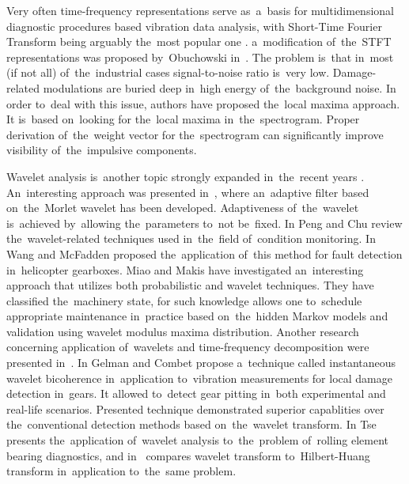 Very often time-frequency representations serve as~a~basis for multidimensional diagnostic procedures based vibration data analysis, with Short-Time Fourier Transform being arguably the~most popular one \cite{oppenheim1999discrete}. a~modification of~the~STFT representations was proposed by~Obuchowski in~\cite{obuch3}. The problem is~that in~most (if not all) of~the~industrial cases signal-to-noise ratio is~very low. Damage-related modulations are buried deep in~high energy of~the~background noise. In order to~deal with this issue, authors have proposed the~local maxima approach. It is~based on~looking for the~local maxima in~the~spectrogram. Proper derivation of~the~weight vector for the~spectrogram can significantly improve visibility of~the~impulsive components. 

Wavelet analysis is~another topic strongly expanded in~the~recent years \cite{WANG1996927, staszewski, samuel3}. An~interesting approach was presented in~\cite{linzuo}, where an~adaptive filter based on~the~Morlet wavelet has been developed. Adaptiveness of~the~wavelet is~achieved by~allowing the~parameters to~not be~fixed. In \cite{rozsz_jve_16} Peng and Chu review the~wavelet-related techniques used in~the~field of~condition monitoring. In \cite{WANG1996927} Wang and McFadden proposed the~application of~this method for fault detection in~helicopter gearboxes. Miao and Makis \cite{MIAO2007840} have investigated an~interesting approach that utilizes both probabilistic and wavelet techniques. They have classified the~machinery state, for such knowledge allows one to~schedule appropriate maintenance in~practice based on~the~hidden Markov models and validation using wavelet modulus maxima distribution. Another research concerning application of~wavelets and time-frequency decomposition were presented in~\cite{ALBADOUR20112083, RUBINI2001287}. In \cite{combet2012novel} Gelman and Combet propose a~technique called instantaneous wavelet bicoherence in~application to~vibration measurements for local damage detection in~gears. It allowed to~detect gear pitting in~both experimental and real-life scenarios. Presented technique demonstrated superior capablities over the~conventional detection methods based on~the~wavelet transform. In \cite{peter2001wavelet} Tse presents the~application of~wavelet analysis to~the~problem of~rolling element bearing diagnostics, and in~\cite{PENG2005974} compares wavelet transform to~Hilbert-Huang transform in~application to~the~same problem.

